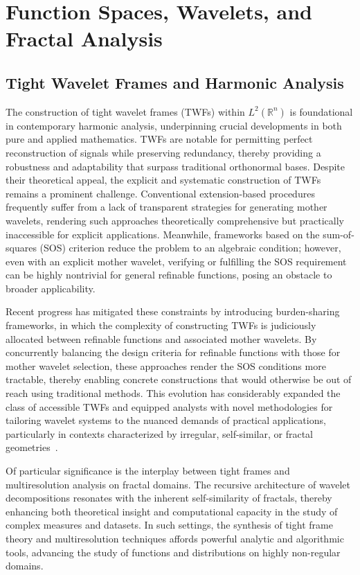 \documentclass[sigconf]{acmart}
\begin{document}
\section{Function Spaces, Wavelets, and Fractal Analysis}

\subsection{Tight Wavelet Frames and Harmonic Analysis}

The construction of tight wavelet frames (TWFs) within $L^2(\mathbb{R}^n)$ is foundational in contemporary harmonic analysis, underpinning crucial developments in both pure and applied mathematics. TWFs are notable for permitting perfect reconstruction of signals while preserving redundancy, thereby providing a robustness and adaptability that surpass traditional orthonormal bases. Despite their theoretical appeal, the explicit and systematic construction of TWFs remains a prominent challenge. Conventional extension-based procedures frequently suffer from a lack of transparent strategies for generating mother wavelets, rendering such approaches theoretically comprehensive but practically inaccessible for explicit applications. Meanwhile, frameworks based on the sum-of-squares (SOS) criterion reduce the problem to an algebraic condition; however, even with an explicit mother wavelet, verifying or fulfilling the SOS requirement can be highly nontrivial for general refinable functions, posing an obstacle to broader applicability.

Recent progress has mitigated these constraints by introducing burden-sharing frameworks, in which the complexity of constructing TWFs is judiciously allocated between refinable functions and associated mother wavelets. By concurrently balancing the design criteria for refinable functions with those for mother wavelet selection, these approaches render the SOS conditions more tractable, thereby enabling concrete constructions that would otherwise be out of reach using traditional methods. This evolution has considerably expanded the class of accessible TWFs and equipped analysts with novel methodologies for tailoring wavelet systems to the nuanced demands of practical applications, particularly in contexts characterized by irregular, self-similar, or fractal geometries~\cite{ref104}.

Of particular significance is the interplay between tight frames and multiresolution analysis on fractal domains. The recursive architecture of wavelet decompositions resonates with the inherent self-similarity of fractals, thereby enhancing both theoretical insight and computational capacity in the study of complex measures and datasets. In such settings, the synthesis of tight frame theory and multiresolution techniques affords powerful analytic and algorithmic tools, advancing the study of functions and distributions on highly non-regular domains.
\end{document}
